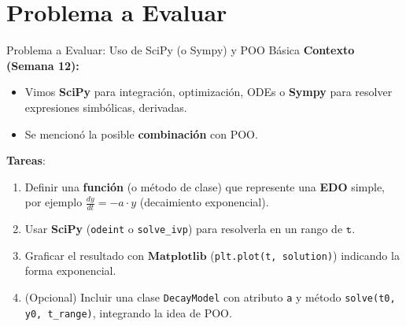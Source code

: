 \documentclass[10pt]{beamer}
\begin{document}
\section{Problema a Evaluar}

\begin{frame}{Problema a Evaluar: Uso de SciPy (o Sympy) y POO Básica}
  \textbf{Contexto (Semana 12):}  
  \begin{itemize}
    \item Vimos \textbf{SciPy} para integración, optimización, ODEs o \textbf{Sympy} para resolver expresiones simbólicas, derivadas.
    \item Se mencionó la posible \textbf{combinación} con POO.
  \end{itemize}

  \textbf{Tareas}:
  \begin{enumerate}
    \item Definir una \textbf{función} (o método de clase) que represente una \textbf{EDO} simple, por ejemplo \(\frac{dy}{dt} = -a \cdot y\) (decaimiento exponencial).
    \item Usar \textbf{SciPy} (\texttt{odeint} o \texttt{solve\_ivp}) para resolverla en un rango de \(\texttt{t}\).
    \item Graficar el resultado con \(\textbf{Matplotlib}\) (\texttt{plt.plot(t, solution)}) indicando la forma exponencial.
    \item (Opcional) Incluir una clase \texttt{DecayModel} con atributo \texttt{a} y método \texttt{solve(t0, y0, t\_range)}, integrando la idea de POO.
  \end{enumerate}
\end{frame}
\end{document}
